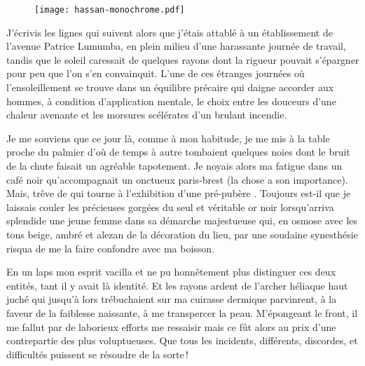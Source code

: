 \begin{figure}[h]
  \centering
  \texttt{[image: hassan-monochrome.pdf]}
  \captionsetup{labelformat=empty}
  \caption[Idéotexte de la tour  (\textarabic{حسان})]{}
\end{figure}

\begin{prose}
  J’écrivis les lignes qui suivent alors que j’étais attablé à un établissement de l’avenue Patrice Lumumba, en plein milieu d’une harassante journée de travail, tandis que le soleil caressait de quelques rayons dont la rigueur pouvait s’épargner pour peu que l’on s’en convainquit.
L’une de ces étranges journées où l’ensoleillement se trouve dans un équilibre précaire qui daigne accorder aux hommes, à condition d’application mentale, le choix entre les douceurs d’une chaleur avenante et les morsures scélérates d’un brulant incendie.

  Je me souviens que ce jour là, comme à mon habitude, je me mis à la table proche du palmier d’où de temps à autre tombaient quelques noies dont le bruit de la chute faisait un agréable tapotement. Je noyais alors ma fatigue dans un café noir qu’accompagnait un onctueux paris-brest (la chose a son importance). Mais, trêve de  qui tourne à l’exhibition d’une  pré-pubère . Toujours est-il que je laissais couler les précieuses gorgées du seul et véritable or noir lorsqu’arriva splendide une jeune femme dans sa démarche majestueuse qui, en osmose avec les tons beige, ambré et alezan de la décoration du lieu, par une soudaine synesthésie risqua de me la faire confondre avec ma boisson.

  En un laps mon esprit vacilla et ne pu honnêtement plus distinguer ces deux entités, tant il y avait là identité. Et les rayons ardent de l’archer héliaque haut juché qui jusqu’à lors trébuchaient sur ma cuirasse dermique parvinrent, à la faveur de la faiblesse naissante, à me transpercer la peau. M’épongeant le front, il me fallut par de laborieux efforts me ressaisir mais ce fût alors au prix d’une contrepartie des plus voluptueuses. Que tous les incidents, différents, discordes, et difficultés puissent se résoudre de la sorte\,!


\end{prose}
